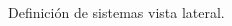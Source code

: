 \documentclass[a4paper,12pt]{article}
\begin{document}
\begin{figure}[H]
    \centering
    \begin{adjustbox}{scale = 0.7, max width=\columnwidth}
    \end{adjustbox}
    \caption{Definición de sistemas vista lateral.}
    \label{KUKA sistemas lateral}
\end{figure}
\end{document}
